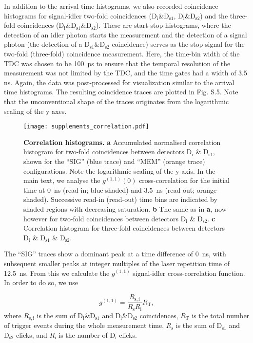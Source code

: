 \documentclass[%
 reprint,
 amsmath,amssymb,
 aps,
 pra,
]{revtex4-1}
\begin{document}
In addition to the arrival time histograms, we also recorded coincidence histograms for signal-idler two-fold coincidences ($\mathrm{D_i}$\&$\mathrm{D_{s1}}$, $\mathrm{D_i}$\&$\mathrm{D_{s2}}$) and the three-fold coincidences ($\mathrm{D_i}$\&$\mathrm{D_{s1}}$\&$\mathrm{D_{s2}}$). These are start-stop histograms, where the detection of an idler photon starts the measurement and the detection of a signal photon (the detection of a $\mathrm{D_{s1}}$\&$\mathrm{D_{s2}}$ coincidence) serves as the stop signal for the two-fold (three-fold) coincidence measurement. Here, the time-bin width of the TDC was chosen to be 100~ps to ensure that the temporal resolution of the measurement was not limited by the TDC, and the time gates had a width of 3.5 ns. Again, the data was post-processed for visualization similar to the arrival time histograms. The resulting coincidence traces are plotted in Fig. S.5. Note that the unconventional shape of the traces originates from the logarithmic scaling of the y axes.

\begin{figure}
\centering
\texttt{[image: supplements\_correlation.pdf]}
\caption{\textbf{Correlation histograms.} \textbf{a} Accumulated normalised correlation histogram for two-fold coincidences between detectors $\mathrm{D_{i}}$ \& $\mathrm{D_{s1}}$, shown for the ``SIG'' (blue trace) and ``MEM'' (orange trace) configurations. Note the logarithmic scaling of the y axis. In the main text, we analyse the $g^{(1,1)}(0)$ cross-correlation for the initial time at 0~ns (read-in; blue-shaded) and 3.5~ns (read-out; orange-shaded). Successive read-in (read-out) time bins are indicated by shaded regions with decreasing saturation. \textbf{b} The same as in \textbf{a}, now however for two-fold coincidences between detectors $\mathrm{D_{i}}$ \& $\mathrm{D_{s2}}$. \textbf{c} Correlation histogram for three-fold coincidences between detectors $\mathrm{D_{i}}$ \& $\mathrm{D_{s1}}$ \& $\mathrm{D_{s2}}$.}
\label{fig:correlations}
\end{figure}

The ``SIG'' traces show a dominant peak at a time difference of 0~ns, with subsequent smaller peaks at integer multiples of the laser repetition time of 12.5~ns. From this we calculate the $g^{(1,1)}$ signal-idler cross-correlation function. In order to do so, we use

\begin{equation}
g^{(1,1)}=\frac{R_\mathrm{s,i}}{R_\mathrm{s}R_\mathrm{i}}R_\mathrm{T},
\end{equation}
where $R_\mathrm{s,i}$ is the sum of $\mathrm{D_{i}}$\&$\mathrm{D_{s1}}$ and $\mathrm{D_{i}}$\&$\mathrm{D_{s2}}$ coincidences, $R_\mathrm{T}$  is the total number of trigger events during the whole measurement time, $R_\mathrm{s}$ is the sum of $\mathrm{D_{s1}}$ and $\mathrm{D_{s2}}$ clicks, and $R_\mathrm{i}$ is the number of $\mathrm{D_{i}}$ clicks.
\end{document}
